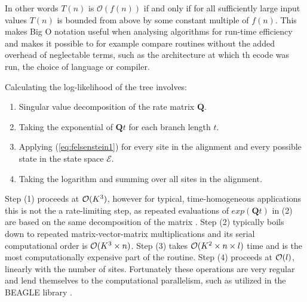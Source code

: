 \documentclass[12pt,twoside]{mitthesis}
\theoremstyle{plain}
\theoremstyle{definition}
\theoremstyle{remark}
\begin{document}
\noindent
In other words $T(n)$ is $\mathcal{O}\left(f(n)\right)$ if and only if for all sufficiently large input values $T(n)$ is bounded from above by some constant multiple of $f(n)$.
This makes Big O notation useful when analysing algorithms for run-time efficiency and makes it possible to for example compare routines without the added overhead of neglectable terms, such as the architecture at which th ecode was run, the choice of language or compiler.







Calculating the log-likelihood of the tree involves:

\begin{enumerate}
\item { Singular value decomposition of the rate matrix $\mathbf{Q}$. }
\item { Taking the exponential of $\mathbf{Q}t$ for each branch length $t$. }
\item { Applying (\ref{eq:felsenstein1}) for every site in the alignment and every possible state in the state space $\mathcal{E}$. }
\item { Taking the logarithm and summing over all sites in the alignment. }
\end{enumerate}

Step (1) proceeds at ${\cal{O}}(K^3)$, however for typical, time-homogeneous applications this is not the a rate-limiting step, as repeated evaluations of $exp(\mathbf{Q}t)$ in (2) are based on the same decomposition of the matrix \citep{Suchard2009}. 
Step (2) typically boils down to repeated matrix-vector-matrix multiplications and its serial computational order is ${\cal{O}}(K^3 \times n)$. 
Step (3) takes ${\cal{O}}(K^2 \times n \times l)$ time and is the most computationally expensive part of the routine. 
Step (4) proceeds at ${\cal{O}}(l)$, linearly with the number of sites.
Fortunately these operations are very regular and lend themselves to the computational parallelism, such as utilized in the BEAGLE library \citep{Suchard2009,Ayres2012}.

\end{document}
